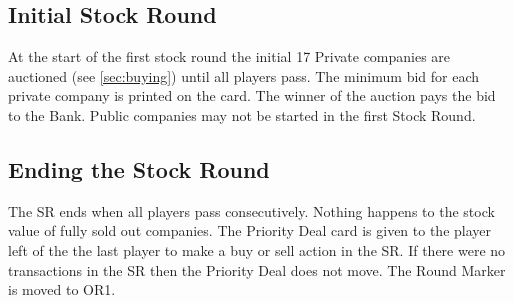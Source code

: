 \documentclass[a4paper]{article}
\begin{document}
\subsection{Initial Stock Round}
At the start of the first stock round the initial 17 Private companies are
auctioned (see \autoref{sec:buying}) until all players pass. The minimum bid for
each private company is printed on the card. The winner of the auction pays the
bid to the Bank. Public companies may not be started in the first Stock Round.

\subsection{Ending the Stock Round}
The SR ends when all players pass consecutively. Nothing happens to the stock
value of fully sold out companies. The Priority Deal card is given to the player
left of the the last player to make a buy or sell action in the SR. If there
were no transactions in the SR then the Priority Deal does not move. The Round
Marker is moved to OR1.
\end{document}
